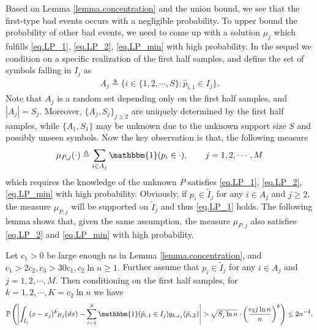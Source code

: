 \documentclass[final,12pt]{colt2018} %
\begin{document}
Based on Lemma \ref{lemma.concentration} and the union bound, we see that the first-type bad events occurs with a negligible probability. To upper bound the probability of other bad events, we need to come up with a solution $\mu_j$ which fulfills \eqref{eq.LP_1}, \eqref{eq.LP_2}, \eqref{eq.LP_min} with high probability. In the sequel we condition on a specific realization of the first half samples, and define the set of symbols falling in $I_j$ as
\begin{align*}
A_j \triangleq \{i\in\{1,2,\cdots,S\}: \hat{p}_{i,1}\in I_j \}.
\end{align*}
Note that $A_j$ is a random set depending only on the first half samples, and $|A_j|=S_j$. Moreover, $\{A_j,S_j\}_{j\ge 2}$ are uniquely determined by the first half samples, while $\{A_1,S_1\}$ may be unknown due to the unknown support size $S$ and possibly unseen symbols. Now the key observation is that, the following measure
\begin{align}\label{eq.mu_P_j}
\mu_{P,j}(\cdot) \triangleq \sum_{i\in A_j} \mathbbm{1}(p_i\in \cdot), \qquad j=1,2,\cdots,M
\end{align}
which requires the knowledge of the unknown $P$ satisfies \eqref{eq.LP_1}, \eqref{eq.LP_2}, \eqref{eq.LP_min} with high probability. Obviously, if $p_i\in \tilde{I}_j$ for any $i\in A_j$ and $j\ge 2$, the measure $\mu_{P,j}$ will be supported on $\tilde{I}_j$ and thus \eqref{eq.LP_1} holds. The following lemma shows that, given the same assumption, the measure $\mu_{P,j}$ also satisfies \eqref{eq.LP_2} and \eqref{eq.LP_min} with high probability.
\begin{lemma}\label{lemma.feasibility}
	Let $c_1>0$ be large enough as in Lemma \ref{lemma.concentration}, and $c_1>2c_2, c_3>30c_1, c_2\ln n\ge 1$. Further assume that $p_i\in \tilde{I}_j$ for any $i\in A_j$ and $j=1,2,\cdots,M$. Then conditioning on the first half samples, for $k=1,2,\cdots,K=c_2\ln n$ we have
	\begin{align*}
	\mathbb{P}\left(\left|\int_{\tilde{I}_j} (x-x_j)^k\mu_j(dx) - \sum_{i=1}^S \mathbbm{1}(\hat{p}_{i,1}\in I_j)g_{k,x_j}(\hat{p}_{i,2})\right| > \sqrt{S_j\ln n}\cdot \left(\frac{c_3j\ln n}{n}\right)^{k} \right)\le 2n^{-4}.
	\end{align*}
\end{lemma}
\end{document}

